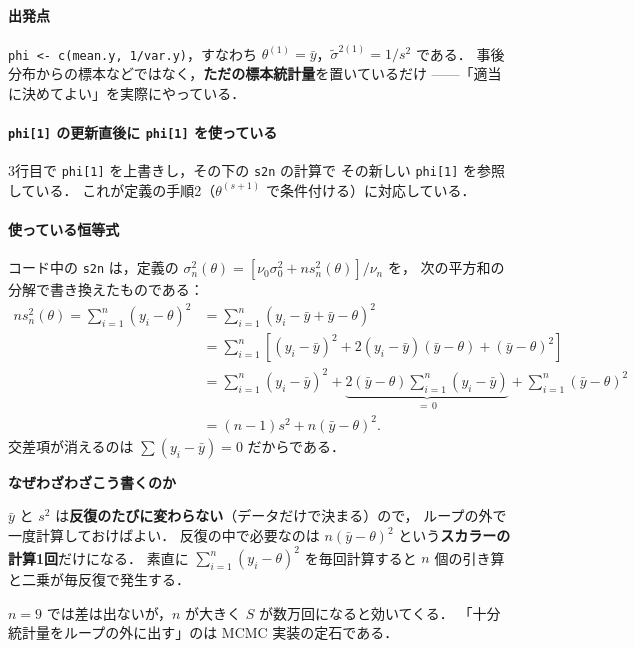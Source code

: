 \documentclass[lualatex,ja=standard,a4paper,12pt]{bxjsarticle}
\begin{document}
\paragraph{出発点}
\texttt{phi <- c(mean.y, 1/var.y)}，すなわち
$\theta^{(1)} = \bar{y}$，$\tilde{\sigma}^{2(1)} = 1/s^2$ である．
事後分布からの標本などではなく，\textbf{ただの標本統計量}を置いているだけ
——「適当に決めてよい」を実際にやっている．

\paragraph{\texttt{phi[1]} の更新直後に \texttt{phi[1]} を使っている}
3行目で \texttt{phi[1]} を上書きし，その下の \texttt{s2n} の計算で
その新しい \texttt{phi[1]} を参照している．
これが定義の手順2（$\theta^{(s+1)}$ で条件付ける）に対応している．

\paragraph{使っている恒等式}
コード中の \texttt{s2n} は，定義の
$\sigma_n^2(\theta) = [\nu_0\sigma_0^2 + n s_n^2(\theta)]/\nu_n$ を，
次の平方和の分解で書き換えたものである：
\begin{align*}
  n s_n^2(\theta) = \sum_{i=1}^{n}(y_i - \theta)^2
  &= \sum_{i=1}^{n}(y_i - \bar{y} + \bar{y} - \theta)^2 \\
  &= \sum_{i=1}^{n}\left[(y_i - \bar{y})^2 + 2(y_i - \bar{y})(\bar{y} - \theta) + (\bar{y} - \theta)^2\right] \\
  &= \sum_{i=1}^{n}(y_i - \bar{y})^2 + \underbrace{2(\bar{y}-\theta)\sum_{i=1}^{n}(y_i - \bar{y})}_{=\,0} + \sum_{i=1}^{n}(\bar{y} - \theta)^2 \\
  &= (n-1)s^2 + n(\bar{y} - \theta)^2.
\end{align*}
交差項が消えるのは $\sum (y_i - \bar{y}) = 0$ だからである．

\begin{pointbox}
\textbf{なぜわざわざこう書くのか}

$\bar{y}$ と $s^2$ は\textbf{反復のたびに変わらない}（データだけで決まる）ので，
ループの外で一度計算しておけばよい．
反復の中で必要なのは $n(\bar{y}-\theta)^2$ という\textbf{スカラーの計算1回}だけになる．
素直に $\sum_{i=1}^{n}(y_i - \theta)^2$ を毎回計算すると
$n$ 個の引き算と二乗が毎反復で発生する．

\medskip
$n = 9$ では差は出ないが，$n$ が大きく $S$ が数万回になると効いてくる．
「十分統計量をループの外に出す」のは MCMC 実装の定石である．
\end{pointbox}
\end{document}
